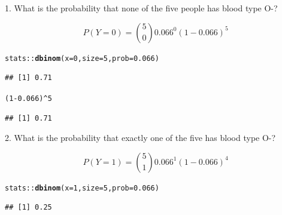 \documentclass[10pt]{beamer}\usepackage[]{graphicx}\usepackage[]{color}
\makeatletter
\newcommand{\hlnum}[1]{\textcolor[rgb]{0.686,0.059,0.569}{#1}}%
\newcommand{\hlopt}[1]{\textcolor[rgb]{0,0,0}{#1}}%
\newcommand{\hlstd}[1]{\textcolor[rgb]{0.345,0.345,0.345}{#1}}%
\newcommand{\hlkwc}[1]{\textcolor[rgb]{0.333,0.667,0.333}{#1}}%
\newcommand{\hlkwd}[1]{\textcolor[rgb]{0.737,0.353,0.396}{\textbf{#1}}}%
\newenvironment{kframe}{%
 \def\at@end@of@kframe{}%
 \ifinner\ifhmode%
  \def\at@end@of@kframe{\end{minipage}}%
  \begin{minipage}{\columnwidth}%
 \fi\fi%
 \def\FrameCommand##1{\hskip\@totalleftmargin \hskip-\fboxsep
 \colorbox{shadecolor}{##1}\hskip-\fboxsep
     \hskip-\linewidth \hskip-\@totalleftmargin \hskip\columnwidth}%
 \MakeFramed {\advance\hsize-\width
   \@totalleftmargin\z@ \linewidth\hsize
   \@setminipage}}%
 {\par\unskip\endMakeFramed%
 \at@end@of@kframe}
\newenvironment{knitrout}{}{} %
\makeatother
\begin{document}
\begin{frame}[fragile]{1. What is the probability that none of the five people has blood type O-?}
	
	$$ 
	P(Y = 0) = \binom{5}{0} 0.066^0 (1- 0.066)^5
	$$
	
	
\begin{knitrout}\tiny
{}\color{fgcolor}\begin{kframe}
\begin{alltt}
\hlstd{stats}\hlopt{::}\hlkwd{dbinom}\hlstd{(}\hlkwc{x} \hlstd{=} \hlnum{0}\hlstd{,} \hlkwc{size} \hlstd{=} \hlnum{5}\hlstd{,} \hlkwc{prob} \hlstd{=} \hlnum{0.066}\hlstd{)}
\end{alltt}
\begin{verbatim}
## [1] 0.71
\end{verbatim}
\begin{alltt}
\hlstd{(}\hlnum{1}\hlopt{-}\hlnum{0.066}\hlstd{)}\hlopt{^}\hlnum{5}
\end{alltt}
\begin{verbatim}
## [1] 0.71
\end{verbatim}
\end{kframe}
\end{knitrout}
	
\end{frame}



\begin{frame}[fragile]{2. What is the probability that exactly one of the five has blood type O-?}
	
	$$ 
	P(Y = 1) = \binom{5}{1} 0.066^1 (1- 0.066)^4
	$$
	
	
\begin{knitrout}\tiny
{}\color{fgcolor}\begin{kframe}
\begin{alltt}
\hlstd{stats}\hlopt{::}\hlkwd{dbinom}\hlstd{(}\hlkwc{x} \hlstd{=} \hlnum{1}\hlstd{,} \hlkwc{size} \hlstd{=} \hlnum{5}\hlstd{,} \hlkwc{prob} \hlstd{=} \hlnum{0.066}\hlstd{)}
\end{alltt}
\begin{verbatim}
## [1] 0.25
\end{verbatim}
\end{kframe}
\end{knitrout}
	
\end{frame}
\end{document}
